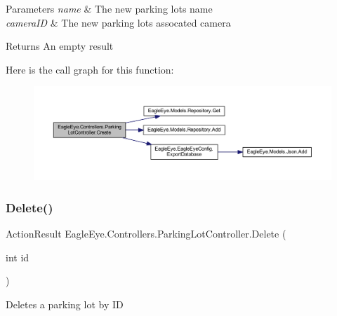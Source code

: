 \begin{DoxyParams}{Parameters}
{\em name} & The new parking lot\textquotesingle{}s name\\
\hline
{\em camera\+ID} & The new parking lot\textquotesingle{}s assocated camera\\
\hline
\end{DoxyParams}
\begin{DoxyReturn}{Returns}
An empty result
\end{DoxyReturn}
Here is the call graph for this function\+:
\nopagebreak
\begin{figure}[H]
\begin{center}
\leavevmode
\includegraphics[width=350pt]{class_eagle_eye_1_1_controllers_1_1_parking_lot_controller_a5af6a4b208418bca8a26f30255c62926_cgraph}
\end{center}
\end{figure}
\mbox{\label{class_eagle_eye_1_1_controllers_1_1_parking_lot_controller_aa26300d7c8f2fa2e41c15ceb0eb5c79e}} 
\subsubsection{\texorpdfstring{Delete()}{Delete()}}
{\footnotesize\ttfamily Action\+Result Eagle\+Eye.\+Controllers.\+Parking\+Lot\+Controller.\+Delete (\begin{DoxyParamCaption}\item[{int}]{id }\end{DoxyParamCaption})}



Deletes a parking lot by ID 


